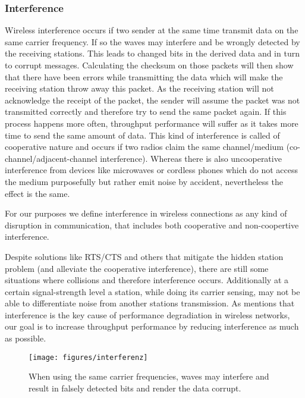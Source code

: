       \subsubsection{Interference}
	Wireless interference occurs if two sender at the same time transmit data on the same carrier frequency. If so the waves may interfere and be wrongly detected
	by the receiving stations. This leads to changed bits in the derived data and in turn to corrupt messages. Calculating the checksum on those packets will then 
	show that there have been errors while transmitting the data which will make the receiving station throw away this packet.
	As the receiving station will not acknowledge the receipt of the packet, the sender will assume the packet was not transmitted correctly and therefore try 
	to send the same packet again. If this process happens more often, throughput performance will suffer as it takes more time to send the same amount of data.
	This kind of interference is called of cooperative nature and occurs if two radios claim the same channel/medium (co-channel/adjacent-channel interference).
	Whereas there is also uncooperative interference from devices like microwaves or cordless phones which do not access the medium purposefully but rather
	emit noise by accident, nevertheless the effect is the same.
	
	For our purposes we define interference in wireless connections as any kind of disruption in communication, that includes both cooperative and non-coopertive interference.
	
	Despite solutions like RTS/CTS and others that mitigate the hidden station problem (and alleviate the cooperative interference),
	there are still some situations where collisions and therefore interference occurs.
	Additionally at a certain signal-strength level a station, while doing its carrier sensing, may not be able to differentiate noise from another stations transmission.
	As \cite{padhye2005estimation} mentions that interference is the key cause of performance degradiation in wireless networks, our goal is to increase throughput 
	performance by reducing interference as much as possible.
	
	\begin{figure}[h!]
	  \centering
	  \texttt{[image: figures/interferenz]}
	  \caption{When using the same carrier frequencies, waves may interfere and result in falsely detected bits and render the data corrupt.}
	  \label{fig:interferenz}
	\end{figure}
	

